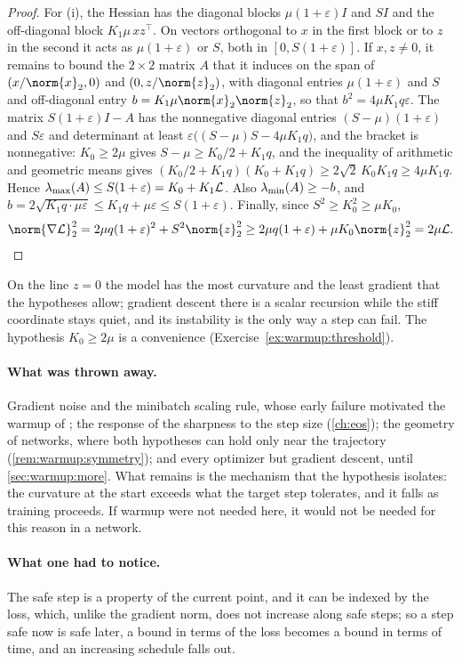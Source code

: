 \begin{refsection}
\begin{proof}
For (i), the Hessian has the diagonal blocks $\mu(1+\varepsilon)I$ and $SI$ and the off-diagonal block $K_1\mu\,xz^\top$. On vectors orthogonal to $x$ in the first block or to $z$ in the second it acts as $\mu(1+\varepsilon)$ or $S$, both in $[0,S(1+\varepsilon)]$. If $x,z\ne0$, it remains to bound the $2\times2$ matrix $A$ that it induces on the span of $(x/\norm{x}_2,0)$ and $(0,z/\norm{z}_2)$, with diagonal entries $\mu(1+\varepsilon)$ and $S$ and off-diagonal entry $b=K_1\mu\norm{x}_2\norm{z}_2$, so that $b^2=4\mu K_1q\varepsilon$. The matrix $S(1+\varepsilon)I-A$ has the nonnegative diagonal entries $(S-\mu)(1+\varepsilon)$ and $S\varepsilon$ and determinant at least $\varepsilon\bigl((S-\mu)S-4\mu K_1q\bigr)$, and the bracket is nonnegative: $K_0\ge2\mu$ gives $S-\mu\ge K_0/2+K_1q$, and the inequality of arithmetic and geometric means gives $(K_0/2+K_1q)(K_0+K_1q)\ge2\sqrt2\,K_0K_1q\ge4\mu K_1q$. Hence $\lambda_{\max}(A)\le S(1+\varepsilon)=K_0+K_1\mathcal{L}$. Also $\lambda_{\min}(A)\ge-b$, and $b=2\sqrt{K_1q\cdot\mu\varepsilon}\le K_1q+\mu\varepsilon\le S(1+\varepsilon)$. Finally, since $S^2\ge K_0^2\ge\mu K_0$,
\[
  \norm{\nabla\Loss}_2^2=2\mu q(1+\varepsilon)^2+S^2\norm{z}_2^2\ge2\mu q(1+\varepsilon)+\mu K_0\norm{z}_2^2=2\mu\Loss .\qedhere
\]
\end{proof}

On the line $z=0$ the model has the most curvature and the least gradient that the hypotheses allow; gradient descent there is a scalar recursion while the stiff coordinate stays quiet, and its instability is the only way a step can fail. The hypothesis $K_0\ge2\mu$ is a convenience (Exercise~\ref{ex:warmup:threshold}).

\paragraph{What was thrown away.} Gradient noise and the minibatch scaling rule, whose early failure motivated the warmup of \textcite{GoyalEtAl2017}; the response of the sharpness to the step size (\cref{ch:eos}); the geometry of networks, where both hypotheses can hold only near the trajectory (\cref{rem:warmup:symmetry}); and every optimizer but gradient descent, until \cref{sec:warmup:more}. What remains is the mechanism that the hypothesis isolates: the curvature at the start exceeds what the target step tolerates, and it falls as training proceeds. If warmup were not needed here, it would not be needed for this reason in a network.

\paragraph{What one had to notice.} The safe step is a property of the current point, and it can be indexed by the loss, which, unlike the gradient norm, does not increase along safe steps; so a step safe now is safe later, a bound in terms of the loss becomes a bound in terms of time, and an increasing schedule falls out.


\end{refsection}
